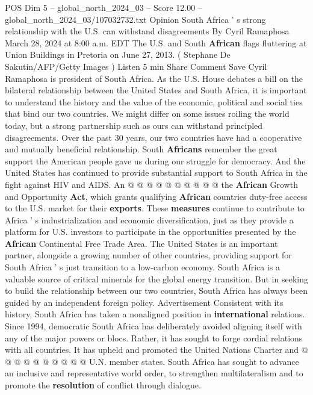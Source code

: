 \begin{textsample}{POS Dim 5 – global\_north\_2024\_03 – Score 12.00 – global\_north\_2024\_03/107032732.txt}  \label{ex:f5_pos_299}
Opinion South Africa ' s strong relationship with the U.S. can withstand disagreements By Cyril Ramaphosa March 28, 2024 at 8:00 a.m.
EDT The U.S. and South \textbf{African} flags fluttering at Union Buildings in Pretoria on June 27, 2013. ( Stephane De Sakutin/AFP/Getty Images ) Listen 5 min Share Comment Save Cyril Ramaphosa is president of South Africa.
As the U.S.
House debates a bill on the bilateral relationship between the United States and South Africa, it is important to understand the history and the value of the economic, political and social ties that bind our two countries.
We might differ on some issues roiling the world today, but a strong partnership such as ours can withstand principled disagreements.
Over the past 30 years, our two countries have had a cooperative and mutually beneficial relationship.
South \textbf{Africans} remember the great support the American people gave us during our struggle for democracy.
And the United States has continued to provide substantial support to South Africa in the fight against HIV and AIDS.
An @ @ @ @ @ @ @ @ @ @ the \textbf{African} Growth and Opportunity \textbf{Act}, which grants qualifying \textbf{African} countries duty-free access to the U.S. market for their \textbf{exports}.
These \textbf{measures} continue to contribute to Africa ' s industrialization and economic diversification, just as they provide a platform for U.S. investors to participate in the opportunities presented by the \textbf{African} Continental Free Trade Area.
The United States is an important partner, alongside a growing number of other countries, providing support for South Africa ' s just transition to a low-carbon economy.
South Africa is a valuable source of critical minerals for the global energy transition.
But in seeking to build the relationship between our two countries, South Africa has always been guided by an independent foreign policy.
Advertisement Consistent with its history, South Africa has taken a nonaligned position in \textbf{international} relations.
Since 1994, democratic South Africa has deliberately avoided aligning itself with any of the major powers or blocs.
Rather, it has sought to forge cordial relations with all countries.
It has upheld and promoted the United Nations Charter and @ @ @ @ @ @ @ @ @ @ U.N. member states.
South Africa has sought to advance an inclusive and representative world order, to strengthen multilateralism and to promote the \textbf{resolution} of conflict through dialogue.

\end{textsample}
